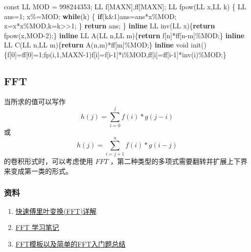 \documentclass[
]{article}
\newenvironment{Shaded}{}{}
\newcommand{\AttributeTok}[1]{\textcolor[rgb]{0.49,0.56,0.16}{#1}}
\newcommand{\ControlFlowTok}[1]{\textcolor[rgb]{0.00,0.44,0.13}{\textbf{#1}}}
\newcommand{\DataTypeTok}[1]{\textcolor[rgb]{0.56,0.13,0.00}{#1}}
\newcommand{\DecValTok}[1]{\textcolor[rgb]{0.25,0.63,0.44}{#1}}
\newcommand{\KeywordTok}[1]{\textcolor[rgb]{0.00,0.44,0.13}{\textbf{#1}}}
\newcommand{\NormalTok}[1]{#1}
\providecommand{\tightlist}{%
  \setlength{\itemsep}{0pt}\setlength{\parskip}{0pt}}
\begin{document}
\begin{Shaded}
\begin{Highlighting}[]
\AttributeTok{const}\NormalTok{ LL MOD = }\DecValTok{998244353}\NormalTok{;}
\NormalTok{LL f[MAXN],ff[MAXN];}
\NormalTok{LL fpow(LL x,LL k)}
\NormalTok{\{}
\NormalTok{    LL ans=}\DecValTok{1}\NormalTok{; x\%=MOD;}
    \ControlFlowTok{while}\NormalTok{(k)}
\NormalTok{    \{}
        \ControlFlowTok{if}\NormalTok{(k\&}\DecValTok{1}\NormalTok{)ans=ans*x\%MOD;}
\NormalTok{        x=x*x\%MOD,k=k\textgreater{}\textgreater{}}\DecValTok{1}\NormalTok{;}
\NormalTok{    \}}
    \ControlFlowTok{return}\NormalTok{ ans;}
\NormalTok{\}}
\KeywordTok{inline}\NormalTok{ LL inv(LL x)\{}\ControlFlowTok{return}\NormalTok{ fpow(x,MOD{-}}\DecValTok{2}\NormalTok{);\}}
\KeywordTok{inline}\NormalTok{ LL A(LL n,LL m)\{}\ControlFlowTok{return}\NormalTok{ f[n]*ff[n{-}m]\%MOD;\}}
\KeywordTok{inline}\NormalTok{ LL C(LL n,LL m)\{}\ControlFlowTok{return}\NormalTok{ A(n,m)*ff[m]\%MOD;\}}
\KeywordTok{inline} \DataTypeTok{void}\NormalTok{ init()\{f[}\DecValTok{0}\NormalTok{]=ff[}\DecValTok{0}\NormalTok{]=}\DecValTok{1}\NormalTok{;fp(i,}\DecValTok{1}\NormalTok{,MAXN{-}}\DecValTok{1}\NormalTok{)f[i]=f[i{-}}\DecValTok{1}\NormalTok{]*i\%MOD,ff[i]=ff[i{-}}\DecValTok{1}\NormalTok{]*inv(i)\%MOD;\}}
\end{Highlighting}
\end{Shaded}

\hypertarget{fft}{%
\subsection{FFT}\label{fft}}

当所求的值可以写作 \[h(j)=\sum_{i=0}^{j}f(i)*g(j-i)\] 或
\[h(j)=\sum_{i=j+1}^{n}f(i)*g(i-j)\] 的卷积形式时，可以考虑使用 \(FFT\)
，第二种类型的多项式需要翻转并扩展上下界来变成第一类的形式。

\hypertarget{ux8d44ux6599-6}{%
\subsubsection{资料}\label{ux8d44ux6599-6}}

\begin{enumerate}
\def\labelenumi{\arabic{enumi}.}
\tightlist
\item
  \href{https://www.cnblogs.com/zwfymqz/p/8244902.html?tdsourcetag=s_pctim_aiomsg}{快速傅里叶变换(FFT)详解}
\item
  \href{https://oi.men.ci/fft-notes/}{FFT 学习笔记}
\item
  \href{https://blog.csdn.net/qq_38891827/article/details/80281151}{FFT模板以及简单的FFT入门题总结}
\end{enumerate}
\end{document}
